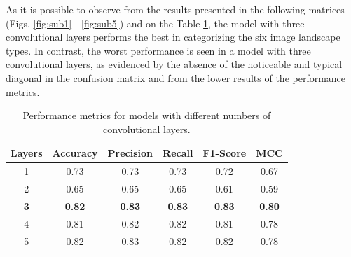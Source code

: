 \documentclass[conference]{IEEEtran}
\begin{document}
As it is possible to observe from the results presented in the following matrices (Figs. \ref{fig:sub1} - \ref{fig:sub5}) and on the Table \ref{tab:model_performance}, the model with three convolutional layers performs the best in categorizing the six image landscape types. In contrast, the worst performance is seen in a model with three convolutional layers, as evidenced by the absence of the noticeable and typical diagonal in the confusion matrix and from the lower results of the performance metrics.

\begin{table}[ht]
    \centering  
    \begin{tabular}{|c|c|c|c|c|c|}
    \hline
    \textbf{Layers} & \textbf{Accuracy} & \textbf{Precision} & \textbf{Recall} & \textbf{F1-Score} & \textbf{MCC} \\ \hline
    1               & 0.73            & 0.73                        & 0.73                     & 0.72                        & 0.67       \\ \hline
    2               & 0.65            & 0.65                        & 0.65                     & 0.61                      & 0.59       \\ \hline
    \textbf{3}               & \textbf{0.82}            & \textbf{0.83}                        & \textbf{0.83}                    & \textbf{0.83}                        & \textbf{0.80}       \\ \hline
    4               & 0.81            & 0.82                        & 0.82                     & 0.81                        & 0.78       \\ \hline
    5               & 0.82            & 0.83                        & 0.82                     & 0.82                        & 0.78       \\ \hline
    \end{tabular}
    \caption{Performance metrics for models with different numbers of convolutional layers.}
    \label{tab:model_performance}
\end{table}
\end{document}

